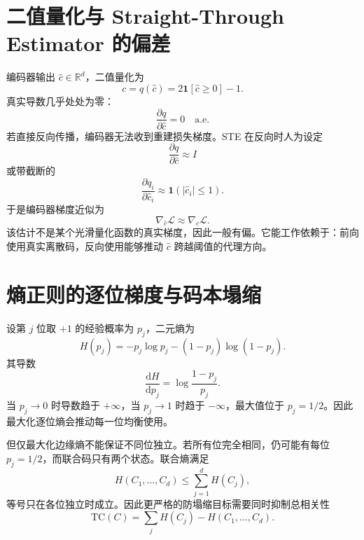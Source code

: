 \documentclass[UTF8,12pt,a4paper,fontset=none]{ctexart}
\numberwithin{equation}{section}
\newcommand{\R}{\mathbb{R}}
\newcommand{\Loss}{\mathcal{L}}
\newcommand{\dd}{\mathrm{d}}
\begin{document}
\section{二值量化与 Straight-Through Estimator 的偏差}
编码器输出 $\hat c\in\R^d$，二值量化为
\begin{equation}
 c=q(\hat c)=2\mathbf 1[\hat c\ge0]-1.
\end{equation}
真实导数几乎处处为零：
\begin{equation}
 \frac{\partial q}{\partial \hat c}=0\quad\text{a.e.}
\end{equation}
若直接反向传播，编码器无法收到重建损失梯度。STE 在反向时人为设定
\begin{equation}
 \frac{\partial q}{\partial \hat c}\approx I
\end{equation}
或带截断的
\begin{equation}
 \frac{\partial q_i}{\partial \hat c_i}
 \approx \mathbf 1(|\hat c_i|\le1).
\end{equation}
于是编码器梯度近似为
\begin{equation}
 \nabla_{\hat c}\Loss\approx\nabla_c\Loss.
\end{equation}
该估计不是某个光滑量化函数的真实梯度，因此一般有偏。它能工作依赖于：前向使用真实离散码，反向使用能够推动 $\hat c$ 跨越阈值的代理方向。

\section{熵正则的逐位梯度与码本塌缩}
设第 $j$ 位取 $+1$ 的经验概率为 $p_j$，二元熵为
\begin{equation}
 H(p_j)=-p_j\log p_j-(1-p_j)\log(1-p_j).
\end{equation}
其导数
\begin{equation}
 \frac{\dd H}{\dd p_j}=\log\frac{1-p_j}{p_j}.
\end{equation}
当 $p_j\to0$ 时导数趋于 $+\infty$，当 $p_j\to1$ 时趋于 $-\infty$，最大值位于 $p_j=1/2$。因此最大化逐位熵会推动每一位均衡使用。

但仅最大化边缘熵不能保证不同位独立。若所有位完全相同，仍可能有每位 $p_j=1/2$，而联合码只有两个状态。联合熵满足
\begin{equation}
 H(C_1,\ldots,C_d)\le\sum_{j=1}^{d}H(C_j),
\end{equation}
等号只在各位独立时成立。因此更严格的防塌缩目标需要同时抑制总相关性
\begin{equation}
 \mathrm{TC}(C)=\sum_j H(C_j)-H(C_1,\ldots,C_d).
\end{equation}
\end{document}
